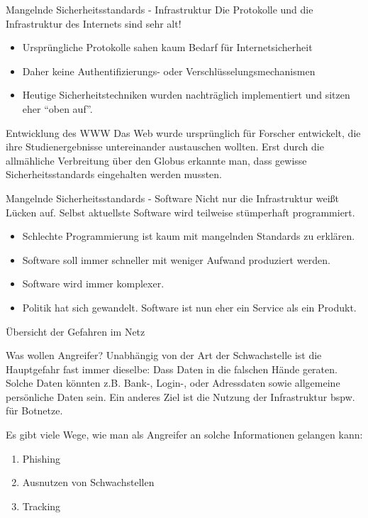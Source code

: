 \documentclass[hyperref={colorlinks,linkcolor=white}, utf8]{beamer}
\begin{document}
	\begin{frame}{Mangelnde Sicherheitsstandards - Infrastruktur}
		\alert{Die Protokolle und die Infrastruktur des Internets sind sehr alt!}
		
		\begin{itemize}
			\item Ursprüngliche Protokolle sahen kaum Bedarf für Internetsicherheit
			\item Daher keine Authentifizierungs- oder Verschlüsselungsmechanismen
			\item Heutige Sicherheitstechniken wurden nachträglich implementiert und sitzen eher \enquote{oben auf}.
		\end{itemize}
	
		\begin{block}{Entwicklung des WWW}
			Das Web wurde ursprünglich für Forscher entwickelt, die ihre Studienergebnisse untereinander austauschen wollten. Erst durch die allmähliche Verbreitung über den Globus erkannte man, dass gewisse Sicherheitsstandards eingehalten werden mussten.
		\end{block}		
	\end{frame}

	\begin{frame}{Mangelnde Sicherheitsstandards - Software}
		Nicht nur die Infrastruktur weißt Lücken auf. Selbst aktuellste Software wird teilweise stümperhaft programmiert.
		\begin{itemize}
			\item Schlechte Programmierung ist kaum mit mangelnden Standards zu erklären.
			\item Software soll immer schneller mit weniger Aufwand produziert werden.
			\item Software wird immer komplexer.
			\item Politik hat sich gewandelt. Software ist nun eher ein Service als ein Produkt.
		\end{itemize}
	\end{frame}

	\begin{frame}{Übersicht der Gefahren im Netz}
		\begin{block}{Was wollen Angreifer?}
			Unabhängig von der Art der Schwachstelle ist die Hauptgefahr fast immer dieselbe: Dass Daten in die falschen Hände geraten. Solche Daten könnten z.B. Bank-, Login-, oder Adressdaten sowie allgemeine persönliche Daten sein. Ein anderes Ziel ist die Nutzung der Infrastruktur bspw. für Botnetze.
		\end{block}
		
		Es gibt viele Wege, wie man als Angreifer an solche Informationen gelangen kann:
		\begin{enumerate}
			\item Phishing
			\item Ausnutzen von Schwachstellen
			\item Tracking			
		\end{enumerate}
	\end{frame}
\end{document}
